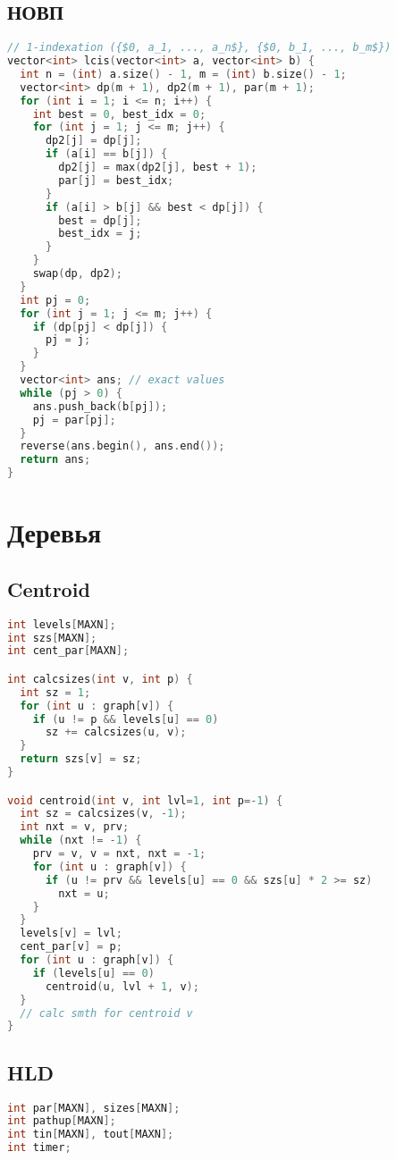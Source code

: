 \documentclass[9pt,a4paper,landscape,twosided]{extarticle}
\begin{document}
\begin{multicols*}{3}
\subsection{НОВП}
\begin{lstlisting}[language=C++]
// 1-indexation ({$0, a_1, ..., a_n$}, {$0, b_1, ..., b_m$})
vector<int> lcis(vector<int> a, vector<int> b) {
  int n = (int) a.size() - 1, m = (int) b.size() - 1;
  vector<int> dp(m + 1), dp2(m + 1), par(m + 1);
  for (int i = 1; i <= n; i++) {
    int best = 0, best_idx = 0;
    for (int j = 1; j <= m; j++) {
      dp2[j] = dp[j];
      if (a[i] == b[j]) {
        dp2[j] = max(dp2[j], best + 1);
        par[j] = best_idx;
      }
      if (a[i] > b[j] && best < dp[j]) {
        best = dp[j];
        best_idx = j;
      }
    }
    swap(dp, dp2);
  }
  int pj = 0;
  for (int j = 1; j <= m; j++) {
    if (dp[pj] < dp[j]) {
      pj = j;
    }
  }
  vector<int> ans; // exact values
  while (pj > 0) {
    ans.push_back(b[pj]);
    pj = par[pj];
  }
  reverse(ans.begin(), ans.end());
  return ans;
}
\end{lstlisting}

\section{Деревья}

\subsection{Centroid}
\begin{lstlisting}[language=C++]
int levels[MAXN];
int szs[MAXN];
int cent_par[MAXN];

int calcsizes(int v, int p) {
  int sz = 1;
  for (int u : graph[v]) {
    if (u != p && levels[u] == 0)
      sz += calcsizes(u, v);
  }
  return szs[v] = sz;
}

void centroid(int v, int lvl=1, int p=-1) {
  int sz = calcsizes(v, -1);
  int nxt = v, prv;
  while (nxt != -1) {
    prv = v, v = nxt, nxt = -1;
    for (int u : graph[v]) {
      if (u != prv && levels[u] == 0 && szs[u] * 2 >= sz)
        nxt = u;
    }
  }
  levels[v] = lvl;
  cent_par[v] = p;
  for (int u : graph[v]) {
    if (levels[u] == 0)
      centroid(u, lvl + 1, v);
  }
  // calc smth for centroid v
}
\end{lstlisting}

\subsection{HLD}
\begin{lstlisting}[language=C++]
int par[MAXN], sizes[MAXN];
int pathup[MAXN];
int tin[MAXN], tout[MAXN];
int timer;


\end{lstlisting}
\end{multicols*}
\end{document}
